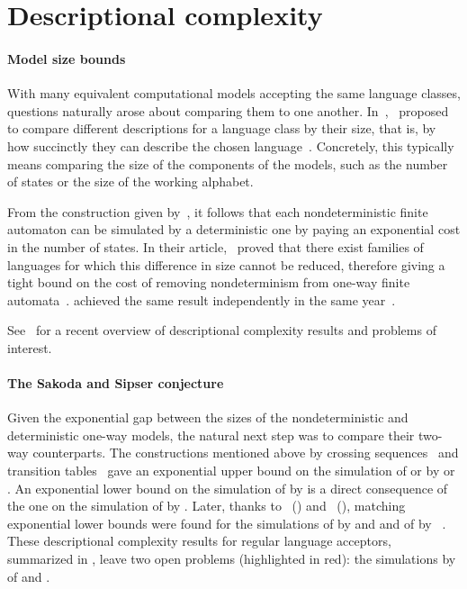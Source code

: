\section{Descriptional complexity}\label{sec:context-descrcomp}

\paragraph{Model size bounds} With many equivalent computational models accepting the same language classes, questions naturally arose about comparing them to one another.
In~\citeyear{MeyFis71},~\citeauthor{MeyFis71} proposed to compare different descriptions for a language class by their size, that is, by how succinctly they can describe the chosen language~\cite{MeyFis71}.
Concretely, this typically means comparing the size of the components of the models, such as the number of states or the size of the working alphabet.

From the construction given by~\citeauthor{RabSco59}, it follows that each nondeterministic finite automaton can be simulated by a deterministic one by paying an exponential cost in the number of states.
In their article,~\citeauthor{MeyFis71} proved that there exist families of languages for which this difference in size cannot be reduced, therefore giving a tight bound on the cost of removing nondeterminism from one-way finite automata~\cite{MeyFis71}.
\citeauthor{Moo71} achieved the same result independently in the same year~\cite{Moo71}.

See~\cite{KutMor+21} for a recent overview of descriptional complexity results and problems of interest.

\paragraph{The Sakoda and Sipser conjecture} Given the exponential gap between the sizes of the nondeterministic and deterministic one-way models, the natural next step was to compare their two-way counterparts.
The constructions mentioned above by crossing sequences~\cite{RabSco59} and transition tables~\cite{She59} gave an exponential upper bound on the simulation of \TNFAs or \TDFAs by \ONFAs or \ODFAs.
An exponential lower bound on the simulation of \TNFAs by \ODFAs is a direct consequence of the one on the simulation of \ONFAs by \ODFAs.
Later, thanks to~\citeauthor{Bir93} (\citeyear{Bir93}) and~\citeauthor{Kap05} (\citeyear{Kap05}), matching exponential lower bounds were found for the simulations of \TDFAs by \ONFAs and \ODFAs and of \TNFAs by \ONFAs~\cite{Bir93,Kap05}.
These descriptional complexity results for regular language acceptors, summarized in , leave two open problems (highlighted in red): the simulations by \TDFAs of \TNFAs and \ONFAs.

